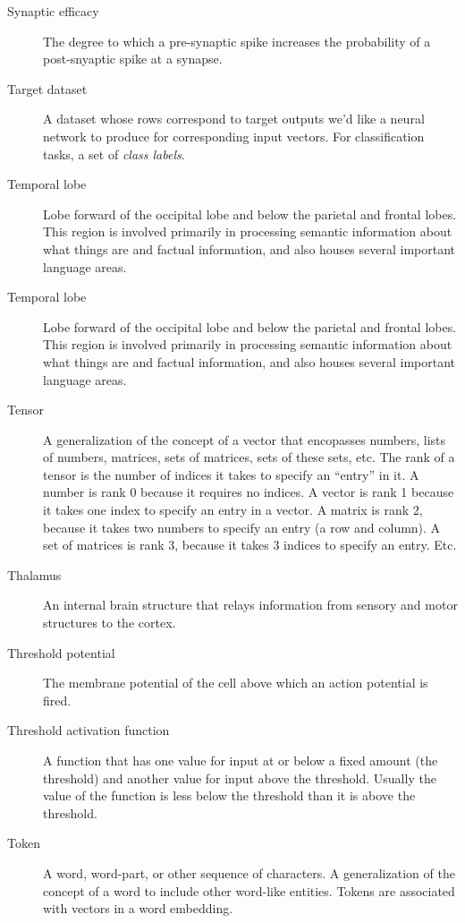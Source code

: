 \begin{description}
\item[Synaptic efficacy] The degree to which a pre-synaptic spike increases the probability of a post-snyaptic spike at a synapse.

\item[Target dataset] A dataset whose rows correspond to target outputs we'd like a neural network to produce for corresponding input vectors. For classification tasks, a set of \emph{class labels}.

\item[Temporal lobe] Lobe forward of the occipital lobe and below the parietal and frontal lobes. This region is involved primarily in processing semantic information about what things are and factual information, and also houses several important language areas.

\item[Temporal lobe] Lobe forward of the occipital lobe and below the parietal and frontal lobes. This region is involved primarily in processing semantic information about what things are and factual information, and also houses several important language areas.

\item[Tensor] A generalization of the concept of a vector that encopasses numbers, lists of numbers, matrices, sets of matrices, sets of these sets, etc. The rank of a  tensor is the number of indices it takes to specify an ``entry'' in it.  A number is rank 0 because it requires no indices. A vector is rank 1 because it takes one index to specify an entry in a vector. A matrix is rank 2, because it takes two numbers to specify an entry (a row and column). A set of matrices is rank 3, because it takes 3 indices to specify an entry. Etc.

\item[Thalamus] An internal brain structure that relays information from sensory and motor structures to the cortex.

\item[Threshold potential] The membrane potential of the cell above which an action potential is fired. 

\item[Threshold activation function] A function that has one value for  input at or below a fixed amount (the threshold) and another value for input above the threshold. Usually the value of the function is less below the  threshold than it is above the threshold.

\item[Token] A word, word-part, or other sequence of characters. A generalization of the concept of a word to include other word-like entities. Tokens are associated with vectors in a word embedding.


\end{description}
